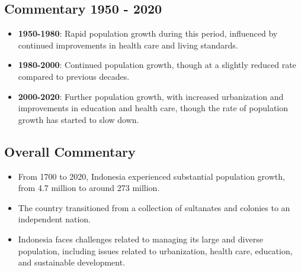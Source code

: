 \subsection*{Commentary 1950 - 2020}
\begin{itemize}
    \item \textbf{1950-1980}: Rapid population growth during this period, influenced by continued improvements in health care and living standards.
    \item \textbf{1980-2000}: Continued population growth, though at a slightly reduced rate compared to previous decades.
    \item \textbf{2000-2020}: Further population growth, with increased urbanization and improvements in education and health care, though the rate of population growth has started to slow down.
\end{itemize}

\subsection*{Overall Commentary}
\begin{itemize}
    \item From 1700 to 2020, Indonesia experienced substantial population growth, from 4.7 million to around 273 million.
    \item The country transitioned from a collection of sultanates and colonies to an independent nation.
    \item Indonesia faces challenges related to managing its large and diverse population, including issues related to urbanization, health care, education, and sustainable development.
\end{itemize}
